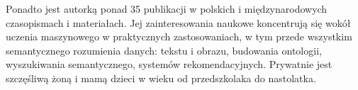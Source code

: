 \documentclass[\main/boa.tex]{subfiles}
\begin{document}
Ponadto jest autorką ponad 35 publikacji w polskich i międzynarodowych czasopismach i materiałach. Jej zainteresowania naukowe koncentrują się wokół uczenia maszynowego w praktycznych zastosowaniach, w tym przede wszystkim semantycznego rozumienia danych: tekstu i obrazu, budowania ontologii, wyszukiwania semantycznego, systemów rekomendacyjnych. Prywatnie jest szczęśliwą żoną i mamą dzieci w wieku od przedszkolaka do nastolatka.
\end{document}
